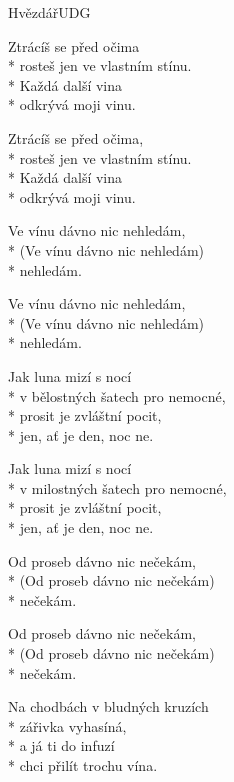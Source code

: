 \documentclass[10.5pt]{book}
\begin{document}
\begin{poem}{Hvězdář}{UDG}

\settowidth{\versewidth}{v bělostných šatech pro nemocné,}

Ztrácíš se před očima\\*
rosteš jen ve vlastním stínu.\\*
Každá další vina\\*
odkrývá moji vinu.

Ztrácíš se před očima,\\*
rosteš jen ve vlastním stínu.\\*
Každá další vina\\*
odkrývá moji vinu.

\begin{altverse}
Ve vínu dávno nic nehledám, \\*
(Ve vínu dávno nic nehledám) \\*
nehledám.
\end{altverse}
\begin{altverse}
Ve vínu dávno nic nehledám, \\*
(Ve vínu dávno nic nehledám) \\*
nehledám.
\end{altverse}

Jak luna mizí s nocí\\*
v bělostných šatech pro nemocné,\\*
prosit je zvláštní pocit,\\*
jen, ať je den, noc ne.

Jak luna mizí s nocí\\*
v milostných šatech pro nemocné,\\*
prosit je zvláštní pocit,\\*
jen, ať je den, noc ne.

\begin{altverse}
Od proseb dávno nic nečekám, \\*
(Od proseb dávno nic nečekám) \\*
nečekám.
\end{altverse}
\begin{altverse}
Od proseb dávno nic nečekám, \\*
(Od proseb dávno nic nečekám) \\*
nečekám.
\end{altverse}

Na chodbách v bludných kruzích \\*
zářivka vyhasíná,\\*
a já ti do infuzí \\*
chci přilít trochu vína.


\end{poem}
\end{document}
